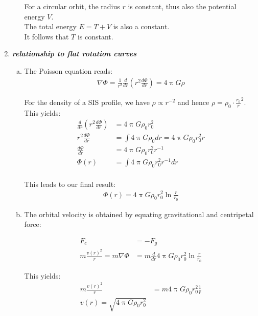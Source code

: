 \documentclass[a4paper,12pt]{article}
\newcommand{\question}[1]{\textbf{\textit{#1}}}
\renewcommand{\pi}{\uppi}
\begin{document}
\begin{enumerate}
\begin{enumerate}[(a)]
			For a circular orbit, the radius $r$ is constant, thus also the potential energy $V$.\\
			The total energy $E=T+V$ is also a constant.\\
			It follows that $T$ is constant.
		\end{enumerate}
		
		\setcounter{equation}{0}
		\item \question{relationship to flat rotation curves}
		\begin{enumerate}[(a)]
			\item The Poisson equation reads: \\
			
			\begin{align*}
			\nabla  \Phi = \frac{1}{r^2} \frac{d}{dr} (r^2 \frac{d\Phi}{dr}) = 4 \pi G \rho
			\end{align*}
			
			For the density of a SIS profile, we have $\rho \propto r^{-2}$ and hence $\rho = \rho_0 \cdot \frac{r_0}{r}^2$.\\             
			This yields: \\
			\begin{align*}
			\frac{d}{dr} (r^2 \frac{d\Phi}{dr}) &= 4 \pi G \rho_0 r_0^2 \\
			r^2 \frac{d\Phi}{dr} &= \int 4 \pi G \rho_0 dr = 4 \pi G \rho_0 r_0^2  r \\
			\frac{d\Phi}{dr} &= 4 \pi G \rho_0 r_0^2 r^{-1} \\
			\Phi(r) &= \int 4 \pi G \rho_0 r_0^2 r^{-1} dr \\
			\end{align*}
			
			This leads to our final result: \\
			\begin{align*}
			\Phi(r) = 4 \pi G \rho_0 r_0^2 \ln \frac{r}{r_0}
			\end{align*}
			
			
			
			
			\item The orbital velocity is obtained by equating gravitational and centripetal force: 
			
			\begin{align*}
			F_c &= - F_g \\
			m \frac{v(r)^2}{r} = m \nabla \Phi &= m \frac{d}{dr} 4 \pi G \rho_0r_0^2 \ln \frac{r}{r_0}
			\end{align*}
			
			This yields: 
			\begin{align*}
			m \frac{v(r)^2}{r} &= m 4 \pi G \rho_0 r_0^2 \frac{1}{r}\\
			v(r) = \sqrt{4 \pi G \rho_0 r_0^2} \\
			\end{align*}
			

\end{enumerate}
\end{enumerate}
\end{document}
